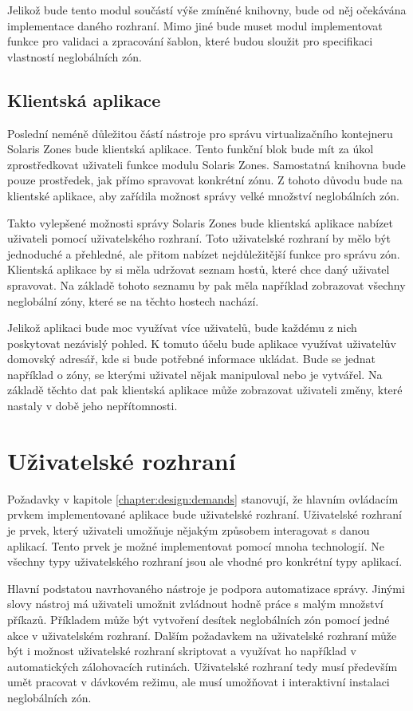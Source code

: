Jelikož bude tento modul součástí výše zmíněné knihovny, bude od něj očekávána implementace daného rozhraní. Mimo jiné 
bude muset modul implementovat funkce pro validaci a zpracování šablon, které budou sloužit pro specifikaci vlastností
neglobálních zón.
\subsection{Klientská aplikace}
\label{chapter:design:architecture:client}
Poslední neméně důležitou částí nástroje pro správu virtualizačního kontejneru Solaris Zones bude klientská aplikace. Tento
funkční blok bude mít za úkol zprostředkovat uživateli funkce modulu Solaris Zones. Samostatná knihovna bude pouze prostředek,
jak přímo spravovat konkrétní zónu. Z tohoto důvodu bude na klientské aplikace, aby zařídila možnost správy velké množství
neglobálních zón.

Takto vylepšené možnosti správy Solaris Zones bude klientská aplikace nabízet uživateli pomocí uživatelského rozhraní. Toto
uživatelské rozhraní by mělo být jednoduché a přehledné, ale přitom nabízet nejdůležitější funkce pro správu zón. Klientská
aplikace by si měla udržovat seznam hostů, které chce daný uživatel spravovat. Na základě tohoto seznamu by pak měla například
zobrazovat všechny neglobální zóny, které se na těchto hostech nachází.

Jelikož aplikaci bude moc využívat více uživatelů, bude každému z nich poskytovat nezávislý pohled. K tomuto účelu bude aplikace
využívat uživatelův domovský adresář, kde si bude potřebné informace ukládat. Bude se jednat například o zóny, se kterými
uživatel nějak manipuloval nebo je vytvářel. Na základě těchto dat pak klientská aplikace může zobrazovat uživateli změny,
které nastaly v době jeho nepřítomnosti.
\section{Uživatelské rozhraní}
\label{chapter:design:ui}
Požadavky v kapitole \ref{chapter:design:demands} stanovují, že hlavním ovládacím prvkem implementované aplikace bude
uživatelské rozhraní. Uživatelské rozhraní je prvek, který uživateli umožňuje nějakým způsobem interagovat s danou aplikací.
Tento prvek je možné implementovat pomocí mnoha technologií. Ne všechny typy uživatelského rozhraní jsou ale vhodné pro 
konkrétní typy aplikací.

Hlavní podstatou navrhovaného nástroje je podpora automatizace správy. Jinými slovy nástroj má uživateli umožnit zvládnout
hodně práce s malým množství příkazů. Příkladem může být vytvoření desítek neglobálních zón pomocí jedné akce v uživatelském 
rozhraní. Dalším požadavkem na uživatelské rozhraní může být i možnost uživatelské rozhraní skriptovat a využívat ho například
v automatických zálohovacích rutinách. Uživatelské rozhraní tedy musí především umět pracovat v dávkovém režimu, ale musí
umožňovat i interaktivní instalaci neglobálních zón.

